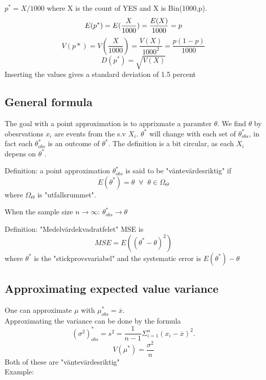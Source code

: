 \documentclass{article}
\begin{document}
        $p^* = X/1000$ where X is the count of YES and X is Bin(1000,p).
        \[
            E(p^*) = E(\frac{X}{1000}) = \frac{E(X)}{1000} = p \\
        \]
        \[
            V(p*) = V(\frac{X}{1000}) = \frac{V(X)}{1000^2} = 
            \frac{p(1-p)}{1000}
        \]
        \[
            D(p^*) = \sqrt{V(X)}
        \]
        Inserting the values gives a standard deviation of 1.5 percent
    \subsection{General formula}
        The goal with a point approximation is to apprixmate a paramter $\theta$. 
        We find $\theta$ by obesrvations $x_i$ are events from the s.v $X_i$. 
        $\theta^*$ will change with each set of $\theta_{obs}^*$, in fact
        each $\theta_{obs}^*$ is an outcome of $\theta^*$. The definition is a bit
        circular, as each $X_i$ depens on $\theta^*$. 

        \begin{tcolorbox}

            Definition: a point approximation $\theta_{obs}^*$ is said to be
            "väntevärdesriktig" if 
            \[
                E(\theta^*) = \theta \;\;\forall \;\;\theta \in \Omega_{\Theta}
            \]
            where $\Omega_{\Theta}$ is "utfallsrummet". 

        \end{tcolorbox}
        When the sample size $n \to \infty$:  $\theta_{obs}^* \to \theta$
        \begin{tcolorbox}

            Definition: "Medelvärdekvadratfelet" MSE is
            \[
                MSE = E((\theta^* - \theta)^2)
            \]
            where $\theta^*$ is the "stickprovsvariabel" and the systematic
            error is    $E(\theta^*) - \theta$


        \end{tcolorbox}
    \subsection{Approximating expected value variance}
        One can approximate $\mu$ with $\mu_{obs}^* = \overline{x}.$\\
        Approximating the variance can be done by the formula
        \[
            (\sigma^2)_{obs}^* = s^2 = \frac{1}{n-1} \Sigma_{i=1}^n (x_i - \overline{x})^2.  
        \]
        \[
            V(\mu^*) = \frac{\sigma^2}{n}
        \]
        Both of these are "väntevärdesriktig"\\
        Example:\\\\
\end{document}
